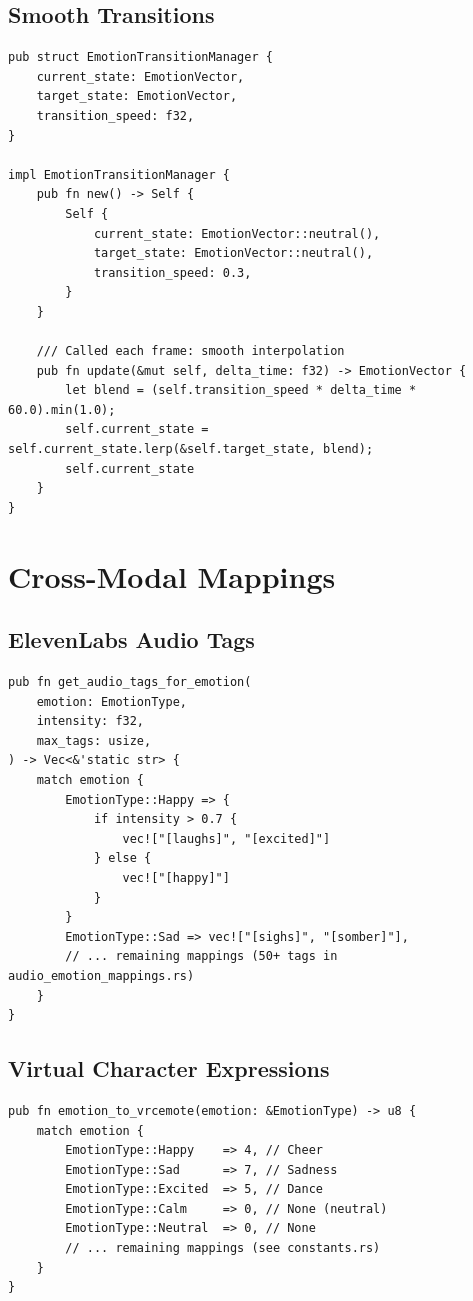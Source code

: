 \documentclass[11pt,letterpaper]{article}
\begin{document}
\subsection{Smooth Transitions}

\begin{lstlisting}[caption=Emotion Transition Manager]
pub struct EmotionTransitionManager {
    current_state: EmotionVector,
    target_state: EmotionVector,
    transition_speed: f32,
}

impl EmotionTransitionManager {
    pub fn new() -> Self {
        Self {
            current_state: EmotionVector::neutral(),
            target_state: EmotionVector::neutral(),
            transition_speed: 0.3,
        }
    }

    /// Called each frame: smooth interpolation
    pub fn update(&mut self, delta_time: f32) -> EmotionVector {
        let blend = (self.transition_speed * delta_time * 60.0).min(1.0);
        self.current_state = self.current_state.lerp(&self.target_state, blend);
        self.current_state
    }
}
\end{lstlisting}

\section{Cross-Modal Mappings}

\subsection{ElevenLabs Audio Tags}

\begin{lstlisting}[caption=Emotion to Audio Tags]
pub fn get_audio_tags_for_emotion(
    emotion: EmotionType,
    intensity: f32,
    max_tags: usize,
) -> Vec<&'static str> {
    match emotion {
        EmotionType::Happy => {
            if intensity > 0.7 {
                vec!["[laughs]", "[excited]"]
            } else {
                vec!["[happy]"]
            }
        }
        EmotionType::Sad => vec!["[sighs]", "[somber]"],
        // ... remaining mappings (50+ tags in audio_emotion_mappings.rs)
    }
}
\end{lstlisting}

\subsection{Virtual Character Expressions}

\begin{lstlisting}[caption=Emotion to Avatar Config]
pub fn emotion_to_vrcemote(emotion: &EmotionType) -> u8 {
    match emotion {
        EmotionType::Happy    => 4, // Cheer
        EmotionType::Sad      => 7, // Sadness
        EmotionType::Excited  => 5, // Dance
        EmotionType::Calm     => 0, // None (neutral)
        EmotionType::Neutral  => 0, // None
        // ... remaining mappings (see constants.rs)
    }
}
\end{lstlisting}
\end{document}
